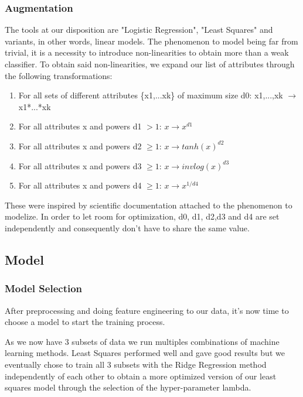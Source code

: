 \documentclass[10pt,conference,compsocconf]{IEEEtran}
\begin{document}
\subsubsection{Augmentation}
The tools at our disposition are "Logistic Regression", "Least Squares" and variants, in other words, linear models. The phenomenon to model being far from trivial, it is a necessity to introduce non-linearities to obtain more than a weak classifier. To obtain said non-linearities, we expand our list of attributes through the following transformations:
\begin{enumerate}
    \item For all sets of different attributes \{x1,...xk\} of maximum size d0:
    \newline
    x1,...,xk $\rightarrow$ x1*...*xk
    \item For all attributes x and powers d1 $> 1$: 
    \newline
    $x \rightarrow x^{d1}$
    \item For all attributes x and powers d2 $\geq 1$: 
    \newline
    $x \rightarrow tanh(x)^{d2}$
    \item For all attributes x and powers d3 $\geq 1$: 
    \newline
    $x \rightarrow invlog(x)^{d3}$
    \item For all attributes x and powers d4 $\geq 1$:
    \newline
    $x \rightarrow x^{1/d4}$
\end{enumerate}
These were inspired by scientific documentation attached to the phenomenon to modelize. In order to let room for optimization, d0, d1, d2,d3 and d4 are set independently and consequently don't have to share the same value.


\subsection{Model}
\subsubsection{Model Selection}
After preprocessing and doing feature engineering to our data, it's now time to choose a model to start the training process.


As we now have 3 subsets of data we run multiples combinations of machine learning methods. Least Squares performed well and gave good results but we eventually chose to train all 3 subsets with the Ridge Regression method independently of each other to obtain a more optimized version of our least squares model through the selection of the hyper-parameter lambda.
\end{document}
